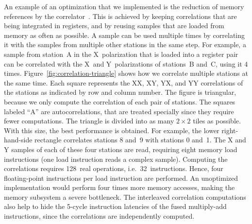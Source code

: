\documentclass{sig-alternate}
\begin{document}
An example of an optimization that we implemented is the reduction of
memory references by the correlator~\cite{Romein:06}.
This is achieved by keeping correlations that are being integrated
in registers, and by reusing samples that are loaded from memory as often
as possible.
A sample can be used multiple times by correlating it with the samples from
multiple other stations in the same step.
For example, a sample from station~A in the X~polarization that is loaded into
a register pair can be correlated with the X~and Y~polarizations of
stations~B and~C, using it 4 times.
Figure~\ref{fig:correlation-triangle} shows how we correlate multiple
stations at the same time.
Each square represents the XX, XY, YX, and YY correlations of the stations
as indicated by row and column number.
The figure is triangular, because we only compute the correlation of each
pair of stations.
The squares labeled ``\textsf{A}'' are autocorrelations, that are treated
specially since they require fewer computations.
The triangle is divided into as many $2\times2$ tiles as possible. With this size, 
the best performance is obtained.
For example, the lower right-hand-side rectangle correlates stations 8 and~9
with stations 0 and~1.
The X and Y samples of each of these four stations are read, requiring eight
memory load instructions (one load instruction reads a complex sample).
Computing the correlations requires 128~real operations, i.e.\ 32~instructions.
Hence, four floating-point instructions per load instruction are performed.
An unoptimized implementation would perform four times more memory accesses,
making the memory subsystem a severe bottleneck.
The interleaved correlation computations also help to hide the 5-cycle
instruction latencies of the fused multiply-add instructions, since
the correlations are independently computed.


\end{document}
